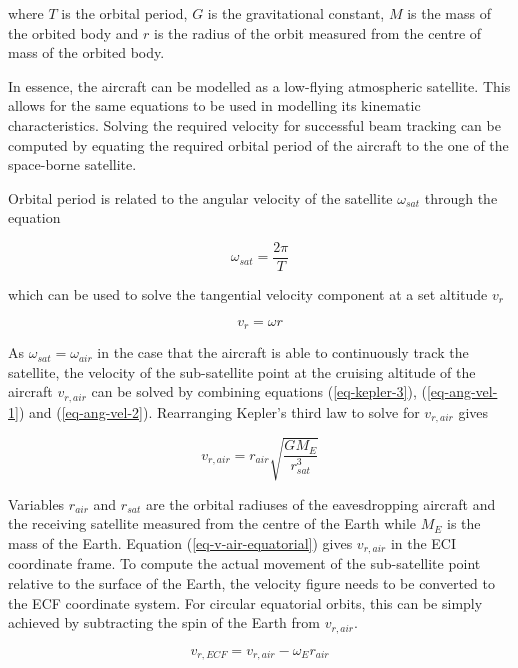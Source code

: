 \documentclass[english, 12pt, a4paper, elec, utf8, a-1b, online]{aaltothesis}
\begin{document}
where $T$ is the orbital period, $G$ is the gravitational constant, $M$ is the mass of the orbited body and $r$ is the radius of the orbit measured from the centre of mass of the orbited body.

In essence, the aircraft can be modelled as a low-flying atmospheric satellite.
This allows for the same equations to be used in modelling its kinematic characteristics.
Solving the required velocity for successful beam tracking can be computed by equating the required orbital period of the aircraft to the one of the space-borne satellite.

Orbital period is related to the angular velocity of the satellite $\omega_{sat}$ through the equation

\begin{equation} \label{eq-ang-vel-1}
  \omega_{sat} = \frac{2\pi}{T}
\end{equation}

\noindent
which can be used to solve the tangential velocity component at a set altitude $v_r$

\begin{equation} \label{eq-ang-vel-2}
  v_r = \omega r
\end{equation}

\noindent
As $\omega_{sat} = \omega_{air}$ in the case that the aircraft is able to continuously track the satellite, the velocity of the sub-satellite point at the cruising altitude of the aircraft $v_{r, air}$ can be solved by combining equations (\ref{eq-kepler-3}), (\ref{eq-ang-vel-1}) and (\ref{eq-ang-vel-2}).
Rearranging Kepler's third law to solve for $v_{r, air}$ gives

\begin{equation} \label{eq-v-air-equatorial}
  v_{r, air} = r_{air} \sqrt{\frac{G M_E}{r_{sat}^3}}
\end{equation}

\noindent
Variables $r_{air}$ and $r_{sat}$ are the orbital radiuses of the eavesdropping aircraft and the receiving satellite measured from the centre of the Earth while $M_E$ is the mass of the Earth.
Equation (\ref{eq-v-air-equatorial}) gives $v_{r, air}$ in the ECI coordinate frame.
To compute the actual movement of the sub-satellite point relative to the surface of the Earth, the velocity figure needs to be converted to the ECF coordinate system.
For circular equatorial orbits, this can be simply achieved by subtracting the spin of the Earth from $v_{r, air}$.

\begin{equation}
  v_{r, ECF} = v_{r, air} - \omega_E r_{air}
\end{equation}
\end{document}
